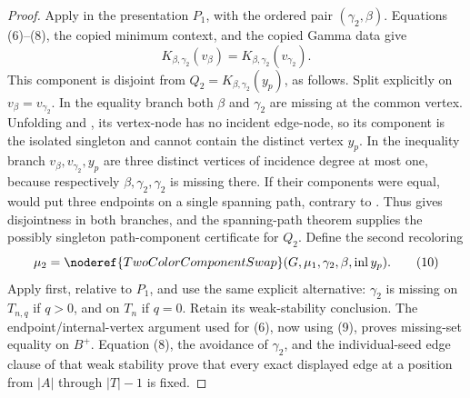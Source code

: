 \begin{proof}
Apply  in the presentation \(P_1\), with the
ordered pair \((\gamma_2,\beta)\).  Equations (6)--(8), the copied minimum context,
and the copied Gamma data give
\[
 K_{\beta,\gamma_2}(v_\beta)
       =K_{\beta,\gamma_2}(v_{\gamma_2}).                    \tag{9}
\]
This component is disjoint from
\(Q_2=K_{\beta,\gamma_2}(y_p)\), as follows.  Split explicitly on
\(v_\beta=v_{\gamma_2}\).  In the equality branch both \(\beta\) and
\(\gamma_2\) are missing at the common vertex.  Unfolding
 and , its
vertex-node has no incident edge-node, so its component is the isolated
singleton and cannot contain the distinct vertex \(y_p\).  In the
inequality branch \(v_\beta,v_{\gamma_2},y_p\) are three distinct
vertices of incidence degree at most one, because respectively
\(\beta,\gamma_2,\gamma_2\) is missing there.  If their components were
equal,  would put three endpoints
on a single spanning path, contrary to
.  Thus
 gives disjointness in both branches,
and the spanning-path theorem supplies the possibly singleton
path-component certificate for \(Q_2\).
Define the second
recoloring
\[
\mu_2=\noderef{TwoColorComponentSwap}
        (G,\mu_1,\gamma_2,\beta,\operatorname{inl}y_p).       \tag{10}
\]
Apply  first, relative to \(P_1\), and
use the same explicit alternative: \(\gamma_2\) is missing on
\(T_{n,q}\) if \(q>0\), and on \(T_n\) if \(q=0\).  Retain its
weak-stability conclusion.  The endpoint/internal-vertex
argument used for (6), now using (9), proves missing-set equality on
\(B^+\).  Equation (8), the avoidance of \(\gamma_2\), and the
individual-seed edge clause of that weak stability prove that every exact
displayed edge at a position from \(|A|\) through \(|T|-1\) is fixed.


\end{proof}
